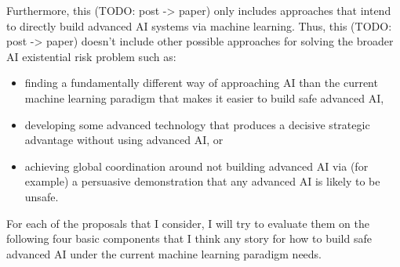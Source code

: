 \documentclass[
  onecolumn,
  natbib,
]{miri-tech-article}
\begin{document}
Furthermore, this (TODO: post -> paper) only includes approaches that intend to directly build advanced AI systems via machine learning. Thus, this (TODO: post -> paper) doesn't include other possible approaches for solving the broader AI existential risk problem such as:

\begin{itemize}
\item finding a fundamentally different way of approaching AI than the current machine learning paradigm that makes it easier to build safe advanced AI,
\item developing some advanced technology that produces a decisive strategic advantage\cite{TODO: cite https://www.lesswrong.com/posts/vkjWGJrFWBnzHtxrw/superintelligence-7-decisive-strategic-advantage} without using advanced AI, or
\item achieving global coordination around not building advanced AI via (for example) a persuasive demonstration that any advanced AI is likely to be unsafe.
\end{itemize}

For each of the proposals that I consider, I will try to evaluate them on the following four basic components that I think any story for how to build safe advanced AI under the current machine learning paradigm needs.
\end{document}
